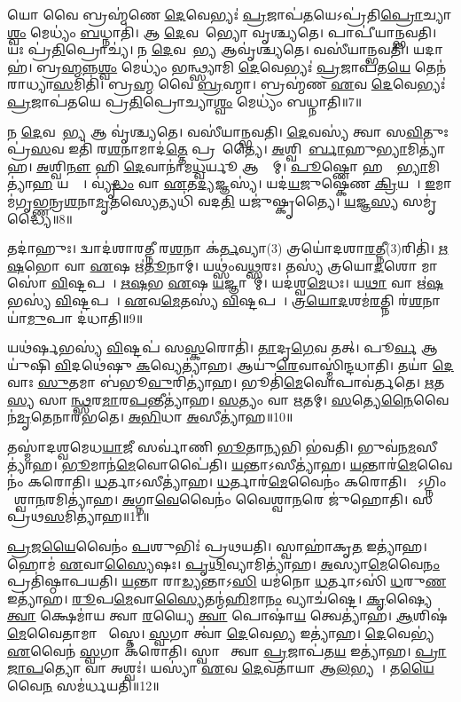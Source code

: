 𑌯𑍋 𑌵𑍈 𑌬𑍍𑌰𑌹𑍍𑌮॑𑌣𑍇 \ul{𑌦𑍇}𑌵𑍇𑌭𑍍𑌯𑌃॑ \ul{𑌪𑍍𑌰}𑌜𑌾𑌪॑\ul{𑌤}𑌯𑍇\-𑌽𑌪𑍍𑌰॑𑌤𑌿\ul{𑌪𑍍𑌰𑍋}𑌚𑍍𑌯𑌾\ul{𑌶𑍍𑌵𑌂} 𑌮𑍇𑌧𑍍𑌯𑌂॑ \ul{𑌬}𑌧𑍍𑌨𑌾𑌤𑌿॑।
𑌆 \ul{𑌦𑍇}𑌵𑌤𑌾᳚𑌭𑍍𑌯𑍋 𑌵𑍃𑌶𑍍𑌚𑍍𑌯𑌤𑍇।
𑌪𑌾𑌪𑍀॑𑌯𑌾𑌨𑍍𑌭𑌵𑌤𑌿।
𑌯𑌃 𑌪𑍍𑌰॑\ul{𑌤𑌿}𑌪𑍍𑌰𑍋𑌚𑍍𑌯॑।
𑌨 \ul{𑌦𑍇}𑌵𑌤𑌾᳚\ul{𑌭𑍍𑌯} 𑌆𑌵𑍃॑𑌶𑍍𑌚𑍍𑌯𑌤𑍇।
𑌵𑌸𑍀॑𑌯𑌾𑌨𑍍𑌭𑌵𑌤𑌿।
𑌯𑌦𑌾𑌹॑।
𑌬𑍍𑌰\ul{𑌹𑍍𑌮}𑌨𑍍𑌨\ul{𑌶𑍍𑌵𑌂} 𑌮𑍇𑌧𑍍𑌯𑌂॑ 𑌭𑌨𑍍𑌥𑍍𑌸𑍍𑌯𑌾𑌮𑌿 \ul{𑌦𑍇}𑌵𑍇𑌭𑍍𑌯𑌃॑ \ul{𑌪𑍍𑌰}𑌜𑌾𑌪॑𑌤\ul{𑌯𑍇} 𑌤𑍇𑌨॑ 𑌰𑌾𑌧𑍍𑌯𑌾\ul{𑌸}𑌮𑌿𑌤𑌿॑।
𑌬𑍍𑌰\ul{𑌹𑍍𑌮} 𑌵𑍈 \ul{𑌬𑍍𑌰}𑌹𑍍𑌮𑌾।
𑌬𑍍𑌰𑌹𑍍𑌮॑𑌣 \ul{𑌏}𑌵 \ul{𑌦𑍇}𑌵𑍇𑌭𑍍𑌯𑌃॑ \ul{𑌪𑍍𑌰}𑌜𑌾𑌪॑𑌤𑌯𑍇 𑌪𑍍𑌰\ul{𑌤𑌿}𑌪𑍍𑌰𑍋𑌚𑍍𑌯𑌾\ul{𑌶𑍍𑌵𑌂} 𑌮𑍇𑌧𑍍𑌯𑌂॑ 𑌬𑌧𑍍𑌨𑌾𑌤𑌿॥7॥

𑌨 \ul{𑌦𑍇}𑌵𑌤𑌾᳚\ul{𑌭𑍍𑌯} 𑌆 𑌵𑍃॑𑌶𑍍𑌚𑍍𑌯𑌤𑍇।
𑌵𑌸𑍀॑𑌯𑌾𑌨𑍍𑌭𑌵𑌤𑌿।
\ul{𑌦𑍇}𑌵𑌸𑍍𑌯॑ 𑌤𑍍𑌵𑌾 𑌸\ul{𑌵𑌿}𑌤𑍁𑌃 𑌪𑍍𑌰॑\ul{𑌸}𑌵 𑌇𑌤𑌿॑ 𑌰\ul{𑌶}𑌨𑌾𑌮𑌾𑌦॑\ul{𑌤𑍍𑌤𑍇} 𑌪𑍍𑌰𑌸𑍂᳚𑌤𑍍𑌯𑍈।
\ul{𑌅}𑌶𑍍𑌵𑌿𑌨𑍋᳚\ul{𑌰𑍍𑌬𑌾}𑌹𑍁\ul{𑌭𑍍𑌯𑌾}𑌮𑌿𑌤𑍍𑌯𑌾॑𑌹।
\ul{𑌅}𑌶𑍍𑌵𑌿\ul{𑌨𑍗} 𑌹𑌿 \ul{𑌦𑍇}𑌵𑌾𑌨𑌾॑𑌮\ul{𑌧𑍍𑌵}𑌰𑍍𑌯𑍂 𑌆𑌸𑍍𑌤𑌾᳚𑌮𑍍।
\ul{𑌪𑍂}𑌷𑍍𑌣𑍋 𑌹𑌸𑍍𑌤𑌾᳚\ul{𑌭𑍍𑌯𑌾}𑌮𑌿𑌤𑍍𑌯𑌾॑\ul{𑌹} 𑌯𑌤𑍍𑌯𑍈᳚।
𑌵𑍍𑌯𑍃॑\ul{𑌦𑍍𑌧𑌂} 𑌵𑌾 \ul{𑌏}𑌤\ul{𑌦𑍍𑌯}𑌜𑍍𑌞𑌸𑍍𑌯॑।
𑌯𑌦॑\ul{𑌯}𑌜𑍁𑌷𑍍𑌕𑍇॑𑌣 \ul{𑌕𑍍𑌰𑌿}𑌯𑌤𑍇᳚।
\ul{𑌇}𑌮𑌾𑌮॑𑌗𑍃𑌭𑍍𑌣𑌨𑍍𑌰\ul{𑌶}𑌨𑌾\ul{𑌮𑍃}𑌤𑌸𑍍𑌯𑍇\-𑌤𑍍𑌯𑌧𑌿॑ 𑌵𑌦\ul{𑌤𑌿} 𑌯𑌜𑍁॑𑌷𑍍𑌕𑍃𑌤𑍍𑌯𑍈।
\ul{𑌯}𑌜𑍍𑌞\ul{𑌸𑍍𑌯} 𑌸𑌮𑍃॑𑌦𑍍𑌧𑍍𑌯𑍈॥8॥

𑌤𑌦𑌾॑𑌹𑍁𑌃।
𑌦𑍍𑌵𑌾𑌦॑𑌶𑌾𑌰𑌤𑍍𑌨𑍀 𑌰\ul{𑌶}𑌨𑌾 𑌕॑\ul{𑌰𑍍𑌤}𑌵𑍍𑌯𑌾(3) 𑌤𑍍𑌰𑌯𑍋॑𑌦𑌶𑌾\ul{𑌰}𑌤𑍍𑌨𑍀(3)\-𑌰𑌿𑌤𑌿॑।
\ul{𑌋}\ul{𑌷}𑌭𑍋 𑌵𑌾 \ul{𑌏}𑌷 𑌋॑\ul{𑌤𑍂}𑌨𑌾𑌮𑍍।
𑌯𑌥𑍍𑌸𑌂॑𑌵\ul{𑌥𑍍𑌸}𑌰𑌃।
𑌤𑌸𑍍𑌯॑ 𑌤𑍍𑌰𑌯𑍋\ul{𑌦}𑌶𑍋 𑌮𑌾𑌸𑍋॑ \ul{𑌵𑌿}𑌷𑍍𑌟𑌪𑌮𑍍᳚।
\ul{𑌋}\ul{𑌷}𑌭 \ul{𑌏}𑌷 \ul{𑌯}𑌜𑍍𑌞𑌾𑌨𑌾᳚𑌮𑍍।
𑌯𑌦॑𑌶𑍍𑌵\ul{𑌮𑍇}𑌧𑌃।
𑌯\ul{𑌥𑌾} 𑌵𑌾 𑌋॑\ul{𑌷}𑌭𑌸𑍍𑌯॑ \ul{𑌵𑌿}𑌷𑍍𑌟𑌪𑌮𑍍᳚।
\ul{𑌏}𑌵\ul{𑌮𑍇}𑌤𑌸𑍍𑌯॑ \ul{𑌵𑌿}𑌷𑍍𑌟𑌪𑌮𑍍᳚।
\ul{𑌤𑍍𑌰}\ul{𑌯𑍋}\ul{𑌦}𑌶𑌮॑\ul{𑌰}𑌤𑍍𑌨𑌿 𑌰॑\ul{𑌶}𑌨𑌾𑌯𑌾॑\ul{𑌮𑍁}𑌪𑌾 𑌦॑𑌧𑌾𑌤𑌿॥9॥

𑌯𑌥॑𑌰𑍍\mbox{}\ul{𑌷}𑌭𑌸𑍍𑌯॑ \ul{𑌵𑌿}𑌷𑍍𑌟𑌪॑ 𑌸\ul{𑌸𑍍𑌕}𑌰𑍋𑌤𑌿॑।
\ul{𑌤𑌾}𑌦𑍃\ul{𑌗𑍇}𑌵 𑌤𑌤𑍍।
𑌪𑍂\ul{𑌰𑍍𑌵} 𑌆𑌯𑍁॑𑌷𑌿 \ul{𑌵𑌿}𑌦𑌥𑍇॑𑌷𑍁 \ul{𑌕}𑌵𑍍𑌯𑍇𑌤𑍍𑌯𑌾॑𑌹।
𑌆𑌯𑍁॑\ul{𑌰𑍇}𑌵𑌾𑌸𑍍𑌮𑌿॑𑌨𑍍𑌦𑌧𑌾𑌤𑌿।
𑌤𑌯𑌾॑ \ul{𑌦𑍇}𑌵𑌾𑌃 \ul{𑌸𑍁}𑌤𑌮𑌾 𑌬॑𑌭𑍂\ul{𑌵𑍁}𑌰𑌿𑌤𑍍𑌯𑌾॑𑌹।
𑌭𑍂𑌤𑌿॑\ul{𑌮𑍇}𑌵𑍋𑌪𑌾𑌵॑𑌰𑍍𑌤𑌤𑍇।
\ul{𑌋}𑌤\ul{𑌸𑍍𑌯} 𑌸𑌾𑌮᳚\ul{𑌨𑍍𑌥𑍍𑌸}𑌰\ul{𑌮𑌾}𑌰\ul{𑌪}𑌨𑍍𑌤𑍀𑌤𑍍𑌯𑌾॑𑌹।
\ul{𑌸}𑌤𑍍𑌯𑌂 𑌵𑌾 \ul{𑌋}𑌤𑌮𑍍।
\ul{𑌸}𑌤𑍍𑌯𑍇\ul{𑌨𑍈}𑌵𑍈𑌨॑\ul{𑌮𑍃}𑌤𑍇𑌨𑌾𑌰॑𑌭𑌤𑍇।
\ul{𑌅}\ul{𑌭𑌿}𑌧𑌾 \ul{𑌅}𑌸𑍀𑌤𑍍𑌯𑌾॑𑌹॥10॥

𑌤𑌸𑍍𑌮𑌾॑𑌦𑌶𑍍𑌵𑌮𑍇𑌧\ul{𑌯𑌾}𑌜𑍀 𑌸𑌰𑍍𑌵𑌾॑𑌣𑌿 \ul{𑌭𑍂}𑌤𑌾\ul{𑌨𑍍𑌯}𑌭𑌿 𑌭॑𑌵𑌤𑌿।
𑌭𑍁𑌵॑𑌨\ul{𑌮}𑌸𑍀𑌤𑍍𑌯𑌾॑𑌹।
\ul{𑌭𑍂}𑌮𑌾𑌨॑\ul{𑌮𑍇}𑌵𑍋𑌪𑍈॑𑌤𑌿।
\ul{𑌯}𑌨𑍍𑌤𑌾\-𑌽𑌸𑍀𑌤𑍍𑌯𑌾॑𑌹।
\ul{𑌯}𑌨𑍍𑌤𑌾𑌰॑\ul{𑌮𑍇}𑌵𑍈𑌨𑌂॑ 𑌕𑌰𑍋𑌤𑌿।
\ul{𑌧}𑌰𑍍𑌤𑌾𑌽𑌸𑍀𑌤𑍍𑌯𑌾॑𑌹।
\ul{𑌧}𑌰𑍍𑌤𑌾𑌰॑\ul{𑌮𑍇}𑌵𑍈𑌨𑌂॑ 𑌕𑌰𑍋𑌤𑌿।
𑌸𑍋᳚𑌽𑌗𑍍𑌨𑌿𑌂 𑌵𑍈᳚𑌶𑍍𑌵𑌾\ul{𑌨}𑌰𑌮𑌿𑌤𑍍𑌯𑌾॑𑌹।
\ul{𑌅}𑌗𑍍𑌨𑌾\ul{𑌵𑍇}𑌵𑍈𑌨𑌂॑ 𑌵𑍈𑌶𑍍𑌵𑌾\ul{𑌨}𑌰𑍇 𑌜𑍁॑𑌹𑍋𑌤𑌿।
𑌸𑌪𑍍𑌰॑𑌥\ul{𑌸}𑌮𑌿𑌤𑍍𑌯𑌾॑𑌹॥11॥

\ul{𑌪𑍍𑌰}𑌜\ul{𑌯𑍈}𑌵𑍈𑌨𑌂॑ \ul{𑌪}𑌶𑍁𑌭𑌿𑌃॑ 𑌪𑍍𑌰𑌥𑌯𑌤𑌿।
𑌸𑍍𑌵𑌾𑌹𑌾॑𑌕𑍃\ul{𑌤} 𑌇𑌤𑍍𑌯𑌾॑𑌹।
𑌹𑍋𑌮॑ \ul{𑌏}𑌵𑌾\ul{𑌸𑍍𑌯𑍈}𑌷𑌃।
\ul{𑌪𑍃}\ul{𑌥𑌿}𑌵𑍍𑌯𑌾𑌮𑌿𑌤𑍍𑌯𑌾॑𑌹।
\ul{𑌅}𑌸𑍍𑌯𑌾\ul{𑌮𑍇}𑌵𑍈\ul{𑌨𑌂} 𑌪𑍍𑌰𑌤𑌿॑\-𑌷𑍍𑌠𑌾𑌪𑌯𑌤𑌿।
\ul{𑌯}𑌨𑍍𑌤𑌾 𑌰𑌾\ul{𑌡𑍍𑌯}𑌨𑍍𑌤𑌾𑌽\ul{𑌸𑌿} 𑌯𑌮॑𑌨𑍋 \ul{𑌧}𑌰𑍍𑌤𑌾𑌽𑌸𑌿॑ \ul{𑌧}𑌰𑍁\ul{𑌣} 𑌇𑌤𑍍𑌯𑌾॑𑌹।
\ul{𑌰𑍂}𑌪\ul{𑌮𑍇}𑌵𑌾\ul{𑌸𑍍𑌯𑍈}𑌤𑌨𑍍𑌮॑\ul{𑌹𑌿}𑌮𑌾\ul{𑌨𑌂} 𑌵𑍍𑌯𑌾𑌚॑𑌷𑍍𑌟𑍇।
\ul{𑌕𑍃}𑌷𑍍𑌯𑍈 \ul{𑌤𑍍𑌵𑌾} 𑌕𑍍𑌷𑍇𑌮𑌾॑𑌯 𑌤𑍍𑌵𑌾 \ul{𑌰}𑌯𑍍𑌯𑍈 \ul{𑌤𑍍𑌵𑌾} 𑌪𑍋𑌷𑌾॑\ul{𑌯} 𑌤𑍍𑌵𑍇𑌤𑍍𑌯𑌾॑𑌹।
\ul{𑌆}𑌶𑌿𑌷॑\ul{𑌮𑍇}𑌵𑍈𑌤𑌾𑌮𑌾 𑌶𑌾᳚𑌸𑍍𑌤𑍇।
\ul{𑌸𑍍𑌵}𑌗𑌾 𑌤𑍍𑌵𑌾॑ \ul{𑌦𑍇}𑌵𑍇\ul{𑌭𑍍𑌯} 𑌇𑌤𑍍𑌯𑌾॑𑌹।
\ul{𑌦𑍇}𑌵𑍇𑌭𑍍𑌯॑ \ul{𑌏}𑌵𑍈𑌨॑ \ul{𑌸𑍍𑌵}𑌗𑌾 𑌕॑𑌰𑍋𑌤𑌿।
𑌸𑍍𑌵𑌾𑌹𑌾᳚ 𑌤𑍍𑌵𑌾 \ul{𑌪𑍍𑌰}𑌜𑌾𑌪॑𑌤\ul{𑌯} 𑌇𑌤𑍍𑌯𑌾॑𑌹।
\ul{𑌪𑍍𑌰𑌾}\ul{𑌜𑌾}\ul{𑌪}𑌤𑍍𑌯𑍋 𑌵𑌾 𑌅𑌶𑍍𑌵𑌃॑।
𑌯𑌸𑍍𑌯𑌾॑ \ul{𑌏}𑌵 \ul{𑌦𑍇}𑌵𑌤𑌾॑𑌯𑌾 𑌆\ul{𑌲}𑌭𑍍𑌯𑌤𑍇᳚।
𑌤\ul{𑌯𑍈}𑌵𑍈\ul{𑌨}\ul{} 𑌸𑌮॑𑌰𑍍𑌧𑌯𑌤𑌿॥12॥\anuvakamend[\ul{𑌬}\ul{𑌧𑍍𑌨𑌾}\ul{𑌤𑌿} 𑌸𑌮𑍃॑𑌦𑍍𑌧𑍍𑌯𑌾 \ul{𑌉}𑌪𑌾𑌦॑𑌧𑌾\ul{𑌤𑍍𑌯}𑌸𑍀𑌤𑍍𑌯𑌾॑\ul{𑌹} 𑌸𑌪𑍍𑌰॑𑌥\ul{𑌸}𑌮𑌿𑌤𑍍𑌯𑌾॑𑌹 \ul{𑌦𑍇}𑌵𑍇\ul{𑌭𑍍𑌯} 𑌇𑌤𑍍𑌯𑌾॑\ul{𑌹} 𑌪𑌞𑍍𑌚॑ 𑌚]

